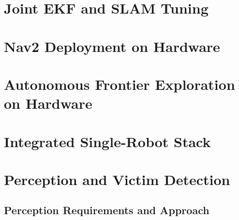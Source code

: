 \section{Joint EKF and SLAM Tuning}
\label{sec:joint_ekf_slam_tuning}

\section{Nav2 Deployment on Hardware}
\label{sec:nav2_hw}

\section{Autonomous Frontier Exploration on Hardware}
\label{sec:explore_hw}

\section{Integrated Single-Robot Stack}
\label{sec:integrated_single_robot}


\section{Perception and Victim Detection}
\label{sec:perception}
\label{chap:perception}

\subsection{Perception Requirements and Approach}
\label{sec:perception_requirements}

